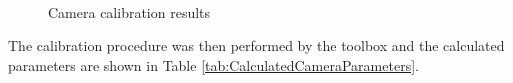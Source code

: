 \documentclass{UoNMCHA}
\numberwithin{equation}{section}
\begin{document}
\begin{figure}[H]%
	\
	
	\caption{Camera calibration results}%
	
	\label{fig:Im}%
	
\end{figure}


 The calibration procedure was then performed by the toolbox and the calculated parameters are shown in Table \ref{tab:CalculatedCameraParameters}.
\end{document}
